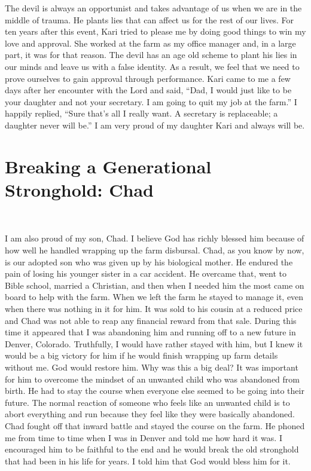 \documentclass[twoside, 12pt]{book}
\begin{document}
The devil is always an opportunist and takes advantage of us when we are in the middle of trauma. He plants lies that can affect us for the rest of our lives. For ten years after this event,  Kari tried to please me by doing good things to win my love and approval. She worked at the farm as my office manager and, in a large part, it was for that reason. The devil has an age old scheme to plant his lies in our minds and leave us with a false identity. As a result, we feel that we need to prove ourselves to gain approval through performance. Kari came to me a few days after her encounter with the Lord and said, “Dad, I would just like to be your daughter and not your secretary. I am going to quit my job at the farm.” I happily replied, “Sure that’s all I really want. A secretary is replaceable; a daughter never will be.” I am  very proud of my daughter Kari and always will be. 

\clearpage


\section{Breaking a Generational Stronghold: Chad}
\
\thispagestyle{emptyhead}

I am also proud of my son, Chad. I believe God has richly blessed him because of how well he handled wrapping up the farm disbursal. Chad, as you know by now, is our adopted son who was given up by his biological mother. He endured the pain of losing his younger sister in a car accident. He overcame that, went to Bible school, married a Christian, and then when I needed him the most came on board to help with the farm. When we left the farm he stayed to manage it, even when there was nothing in it for him. It was sold to his cousin at a reduced price and Chad was not able to reap any financial reward from that sale. During this time it appeared that I was abandoning him and running off to a new future in Denver, Colorado. Truthfully, I would have rather stayed with him, but I knew it would be a big victory for him if he would finish wrapping up farm details without me. God would restore him. Why was this a big deal? It was important for him to overcome the mindset of an unwanted child who was abandoned from birth. He had to stay the course when everyone else seemed to be going into their future. The normal reaction of someone who feels like an unwanted child is to abort everything and run because they feel like they were basically abandoned. Chad fought off that inward battle and stayed the course on the farm. He phoned me from time to time when I was in Denver and told me how hard it was. I encouraged him to be faithful to the end and he would break the old stronghold that had been in his life for years. I told him that God would bless him for it. 
\end{document}
